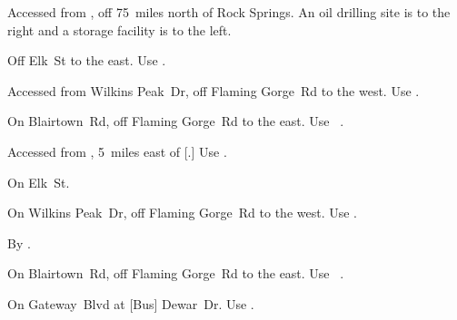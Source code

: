 
\begin{LocationList}

Accessed from , off  75~miles north of Rock Springs.
An oil drilling site is to the right and a storage facility is to the left.

Off  Elk~St to the east.
Use  .

Accessed from Wilkins Peak~Dr, off  Flaming Gorge~Rd to the west.
Use  .

On Blairtown~Rd, off  Flaming Gorge~Rd to the east.
Use~ .

Accessed from , 5~miles east of [.]
Use  .

\Location{\RecruitmentAgency \Recruitment}
On Elk~St.

On Wilkins Peak~Dr, off  Flaming Gorge~Rd to the west.
Use  .

\Location{\TruckStop \Gas \Rest}
By  .

On Blairtown~Rd, off  Flaming Gorge~Rd to the east.
Use~ .

On Gateway~Blvd at [Bus] Dewar~Dr.
Use  .

\end{LocationList}
